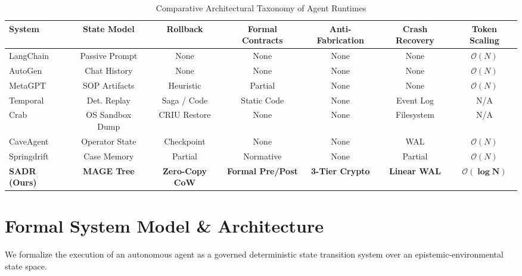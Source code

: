 \documentclass[10pt,journal,compsoc]{IEEEtran}
\begin{document}
\begin{table}[!t]
\centering
\caption{Comparative Architectural Taxonomy of Agent Runtimes}
\label{tab:taxonomy}
\small
\begin{tabular}{lcccccc}
\toprule
\textbf{System} & \textbf{State Model} & \textbf{Rollback} & \textbf{Formal Contracts} & \textbf{Anti-Fabrication} & \textbf{Crash Recovery} & \textbf{Token Scaling} \\
\midrule
LangChain & Passive Prompt & None & None & None & None & $\mathcal{O}(N)$ \\
AutoGen~\cite{wu2023autogen} & Chat History & None & None & None & None & $\mathcal{O}(N)$ \\
MetaGPT~\cite{hong2024metagpt} & SOP Artifacts & Heuristic & Partial & None & None & $\mathcal{O}(N)$ \\
Temporal~\cite{burckhardt2021durable} & Det. Replay & Saga / Code & Static Code & None & Event Log & N/A \\
Crab~\cite{wu2026crab} & OS Sandbox Dump & CRIU Restore & None & None & Filesystem & N/A \\
CaveAgent~\cite{ran2026caveagent} & Operator State & Checkpoint & None & None & WAL & $\mathcal{O}(N)$ \\
Springdrift~\cite{brady2026springdrift} & Case Memory & Partial & Normative & None & Partial & $\mathcal{O}(N)$ \\
\midrule
\textbf{SADR (Ours)} & \textbf{MAGE Tree} & \textbf{Zero-Copy CoW} & \textbf{Formal Pre/Post} & \textbf{3-Tier Crypto} & \textbf{Linear WAL} & $\boldsymbol{\mathcal{O}(\log N)}$ \\
\bottomrule
\end{tabular}
\end{table}


\section{Formal System Model \& Architecture}
We formalize the execution of an autonomous agent as a governed deterministic state transition system over an epistemic-environmental state space.
\end{document}

